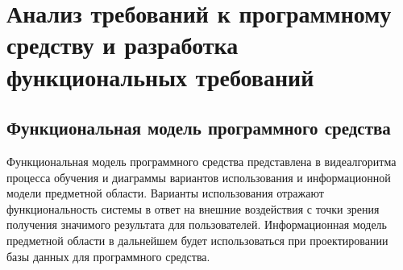 \section{Анализ требований к программному средству и разработка функциональных требований}
\label{sec:domain}

\subsection{Функциональная модель программного средства}
\label{sec:domain:model}

Функциональная модель программного средства представлена в виде алгоритма процесса обучения и диаграммы вариантов использования и информационной модели предметной области. Варианты использования отражают функциональность системы в ответ на внешние воздействия с точки зрения получения значимого результата для пользователей. Информационная модель предметной области в дальнейшем будет использоваться при проектировании базы данных для программного средства.




